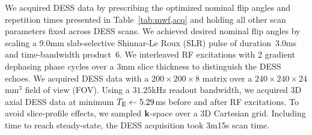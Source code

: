 We acquired DESS data
by prescribing the optimized nominal flip angles and repetition times
presented in Table~\ref{tab:mwf,acq}
and holding all other scan parameters fixed
across DESS scans.
We achieved desired nominal flip angles
by scaling a 9.0mm slab-selective Shinnar-Le Roux (SLR) pulse \cite{pauly:91:prf}
of duration~3.0ms and time-bandwidth product~6.
We interleaved RF excitations 
with 2 gradient dephasing phase cycles
over a 3mm slice thickness
to distinguish the DESS echoes.
We acquired DESS data
with a $200\times200\times8$ matrix
over a $240\times240\times24$mm$^3$ field of view (FOV).
Using a $31.25$kHz readout bandwidth,
we acquired 3D axial DESS data at minimum $T_\mathrm{E} \gets 5.29$ms
before and after RF excitations.
To avoid slice-profile effects,
we sampled $\mathbf{k}$-space over a 3D Cartesian grid.
Including time to reach steady-state,
the DESS acquisition took 3m15s scan time.

